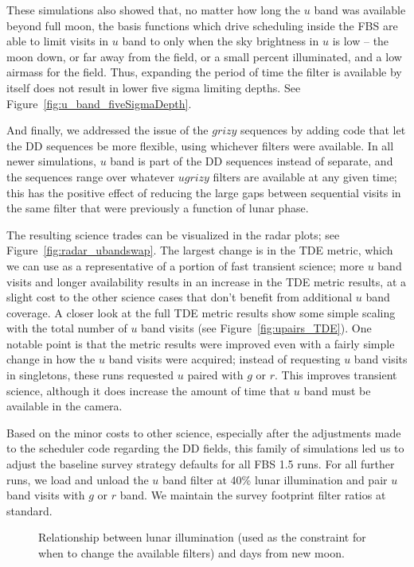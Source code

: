 These simulations also showed that, no matter how long the $u$ band was available beyond full moon, the basis functions which drive scheduling inside the FBS are able to limit visits in $u$ band to only when the sky brightness in $u$ is low -- the moon down, or far away from the field, or a small percent illuminated, and a low airmass for the field. Thus, expanding the period of time the filter is available by itself does not result in lower five sigma limiting depths. See Figure~\ref{fig:u_band_fiveSigmaDepth}. 

And finally, we addressed the issue of the $grizy$ sequences by adding code that let the DD sequences be more flexible, using whichever filters were available. In all newer simulations, $u$ band is part of the DD sequences instead of separate, and the sequences range over whatever $ugrizy$ filters are available at any given time; this has the positive effect of reducing the large gaps between sequential visits in the same filter that were previously a function of lunar phase. 

The resulting science trades can be visualized in the radar plots; see Figure~\ref{fig:radar_ubandswap}. The largest change is in the TDE metric, which we can use as a representative of a portion of fast transient science; more $u$ band visits and longer availability results in an increase in the TDE metric results, at a slight cost to the other science cases that don't benefit from additional $u$ band coverage.  A closer look at the full TDE metric results show some simple scaling with the total number of $u$ band visits (see Figure~\ref{fig:upairs_TDE}). One notable point is that the metric results were improved even with a fairly simple change in how the $u$ band visits were acquired; instead of requesting $u$ band visits in singletons, these runs requested $u$ paired with $g$ or $r$. This improves transient science, although it does increase the amount of time that $u$ band must be available in the camera. 

Based on the minor costs to other science, especially after the adjustments made to the scheduler code regarding the DD fields, this family of simulations led us to adjust the baseline survey strategy defaults for all FBS 1.5 runs. For all further runs, we load and unload the $u$ band filter at 40\% lunar illumination and pair $u$ band visits with $g$ or $r$ band. We maintain the survey footprint filter ratios at standard. 

\begin{figure}
\caption{Relationship between lunar illumination (used as the constraint for when to change the available filters) and days from new moon.}
\label{fig:lunarIllum}
\end{figure}

